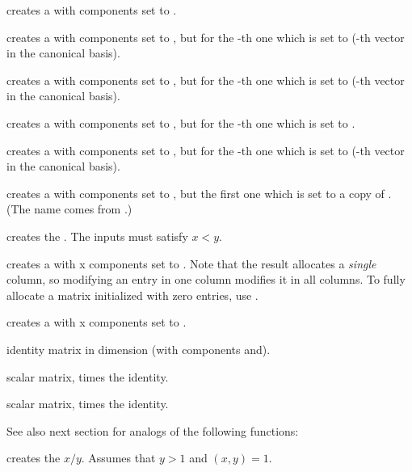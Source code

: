  creates a  with  components set to
.

 creates a  with  components
set to , but for the -th one which is set to 
(-th vector in the canonical basis).

 creates a  with  components
set to , but for the -th one which is set to 
(-th vector in the canonical basis).

 creates a  with 
components set to , but for the -th one which is set to
.

 creates a  with 
components set to , but for the -th one which is set to
 (-th vector in the canonical basis).

 creates a  with 
components set to , but the first one which is set to a copy
of . (The name comes from .)

\smallskip

 creates the  .
The inputs must satisfy $x < y$.

 creates a  with  x 
components set to . Note that the result allocates a
\emph{single} column, so modifying an entry in one column modifies it in
all columns. To fully allocate a matrix initialized with zero entries,
use .

 creates a  with  x
 components set to .

 identity matrix in dimension  (with
components  and).

 scalar matrix,  times the identity.

 scalar matrix,  times
the identity.

\smallskip
See also next section for analogs of the following functions:

 creates the  $x/y$. Assumes that
$y > 1$ and $(x,y) = 1$.

